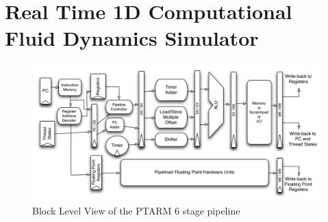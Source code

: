 \section{Real Time 1D Computational Fluid Dynamics Simulator}
\label{sec:1dCFD}


\begin{figure}
  \vspace{-20pt}
  \begin{center}
    \includegraphics[scale=.6]{figs/ptarm_pipeline_six_stage}
  \end{center}
  \vspace{-20pt}
  \caption{Block Level View of the PTARM 6 stage pipeline}
  \label{fig:ptarm_pipeline_six_stage}
\end{figure}

